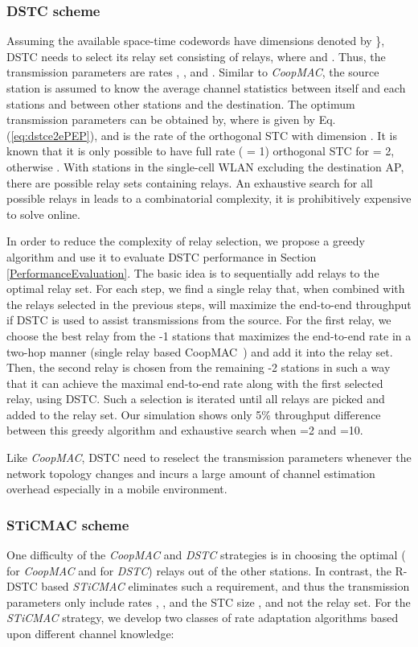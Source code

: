 \documentclass[peerreview,draftcls,onecolumn,12pt,a4paper]{IEEEtran}
\begin{document}
\subsubsection{DSTC scheme}
Assuming the available space-time codewords have dimensions
denoted by \}, DSTC needs to select
its relay set  consisting of  relays, where  and . Thus, the
transmission parameters are rates , ,  and
. Similar to \emph{CoopMAC}, the source station is
assumed to know the average channel statistics between itself and
each stations and between other stations and the destination. The
optimum transmission parameters can be obtained by,
 where  is given by Eq.(\ref{eq:dstce2ePEP}), and
 is the rate of the orthogonal STC with dimension . It
is known that it is only possible to have full rate ( = 1)
orthogonal STC for  = 2, otherwise 
\cite{Jafarkhanistcbook}. With  stations in the single-cell
WLAN excluding the destination AP, there are  possible relay sets  containing  relays. An
exhaustive search for all possible relays in 
leads to a combinatorial complexity, it is prohibitively expensive
to solve online. 


In order to reduce the complexity of relay selection, we propose a greedy algorithm and use it to evaluate DSTC performance in Section \ref{PerformanceEvaluation}. The basic idea is to sequentially add  relays to the optimal relay set. For each step, we find a single relay that, when combined with the relays selected in the previous steps, will maximize the end-to-end throughput if DSTC is used to assist transmissions from the source. For the first relay, we choose the best relay from the -1 stations that maximizes the end-to-end rate in a two-hop manner (single relay based CoopMAC~\cite{coopmacliu}) and add it into the relay set. Then, the second relay is chosen from the remaining -2 stations in such a way that it can achieve the maximal end-to-end rate along with the first selected relay, using DSTC. Such a selection is iterated until all  relays are picked and added to the relay set. Our simulation shows only 5\% throughput difference between this greedy algorithm and exhaustive search when =2 and =10.



Like {\em CoopMAC}, DSTC need to reselect the transmission parameters  whenever the network topology changes and incurs a large amount of channel estimation overhead especially in a mobile environment.

\subsubsection{{STiCMAC} scheme}
One difficulty of the \emph{CoopMAC} and \emph{DSTC} strategies is
in choosing the optimal  ( for \emph{CoopMAC} and
 for \emph{DSTC}) relays out of the  other stations. In contrast, the R-DSTC based
\emph{STiCMAC} eliminates such a requirement, and thus the
transmission parameters only include rates , , and the
STC size , and not the relay set. For
the  \emph{STiCMAC} strategy, we develop two classes of rate
adaptation algorithms based upon different channel knowledge:
\end{document}
